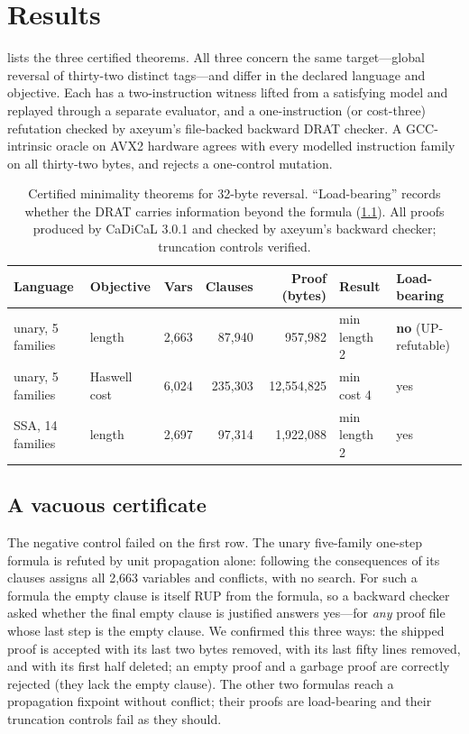 \section{Results}
\label{sec:results}

 lists the three certified theorems. All three concern the same target---global reversal of thirty-two distinct tags---and differ in the declared language and objective. Each has a two-instruction witness lifted from a satisfying model and replayed through a separate evaluator, and a one-instruction (or cost-three) refutation checked by axeyum's file-backed backward DRAT checker. A GCC-intrinsic oracle on AVX2 hardware agrees with every modelled instruction family on all thirty-two bytes, and rejects a one-control mutation.

\begin{table}[t]
\centering
\caption{Certified minimality theorems for 32-byte reversal. \enquote{Load-bearing} records whether the DRAT carries information beyond the formula (\cref{sec:vacuous}). All proofs produced by CaDiCaL 3.0.1 and checked by axeyum's backward checker; truncation controls verified.}
\label{tab:theorems}
\small
\begin{tabular}{llrrrll}
\toprule
Language & Objective & Vars & Clauses & Proof (bytes) & Result & Load-bearing \\
\midrule
unary, 5 families & length & 2{,}663 & 87{,}940 & 957{,}982 & min length 2 & \textbf{no} (UP-refutable) \\
unary, 5 families & Haswell cost & 6{,}024 & 235{,}303 & 12{,}554{,}825 & min cost 4 & yes \\
SSA, 14 families & length & 2{,}697 & 97{,}314 & 1{,}922{,}088 & min length 2 & yes \\
\bottomrule
\end{tabular}
\end{table}

\subsection{A vacuous certificate}
\label{sec:vacuous}

The negative control failed on the first row. The unary five-family one-step formula is refuted by unit propagation alone: following the consequences of its clauses assigns all 2,663 variables and conflicts, with no search. For such a formula the empty clause is itself RUP from the formula, so a backward checker asked whether the final empty clause is justified answers yes---for \emph{any} proof file whose last step is the empty clause. We confirmed this three ways: the shipped proof is accepted with its last two bytes removed, with its last fifty lines removed, and with its first half deleted; an empty proof and a garbage proof are correctly rejected (they lack the empty clause). The other two formulas reach a propagation fixpoint without conflict; their proofs are load-bearing and their truncation controls fail as they should.

